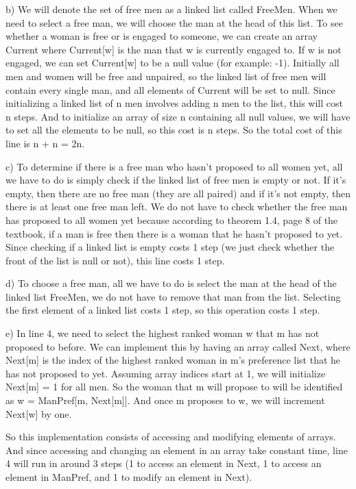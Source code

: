 \documentclass{article}
\begin{document}
b) We will denote the set of free men as a linked list called FreeMen. When we need to select a free man, we will choose the man at the head of this list. To see whether a woman is free or is engaged to someone, we can create an array Current where Current[w] is the man that w is currently engaged to. If w is not engaged, we can set Current[w] to be a null value (for example: -1). Initially all men and women will be free and unpaired, so the linked list of free men will contain every single man, and all elements of Current will be set to null. 
Since initializing a linked list of n men involves adding n men to the list, this will cost n steps.
And to initialize an array of size n containing all null values, we will have to set all the elements to be null, so this cost is n steps.
So the total cost of this line is n + n = 2n.


c) To determine if there is a free man who hasn't proposed to all women yet, all we have to do is simply check if the linked list of free men is empty or not. If it's empty, then there are no free man (they are all paired) and if it's not empty, then there is at least one free man left. We do not have to check whether the free man has proposed to all women yet because according to theorem 1.4, page 8 of the textbook, if a man is free then there is a woman that he hasn't proposed to yet. Since checking if a linked list is empty costs 1 step (we just check whether the front of the list is null or not), this line costs 1 step.

d) 
To choose a free man, all we have to do is select the man at the head of the linked list FreeMen, we do not have to remove that man from the list. Selecting the first element of a linked list costs 1 step, so this operation costs 1 step.


e) In line 4, we need to select the highest ranked woman w that m has not proposed to before. We can implement this by having an array called Next, where Next[m] is the index of the highest ranked woman in m's preference list that he has not proposed to yet. Assuming array indices start at 1, we will initialize Next[m] = 1 for all men. So the woman that m will propose to will be identified as w = ManPref[m, Next[m]]. And once m proposes to w, we will increment Next[w] by one.

So this implementation consists of accessing and modifying elements of arrays. And since accessing and changing an element in an array take constant time, line 4 will run in around 3 steps (1 to access an element in Next, 1 to access an element in ManPref, and 1 to modify an element in Next).
\end{document}
